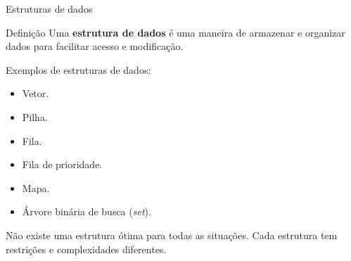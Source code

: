\begin{frame}{Estruturas de dados}

    \begin{block}{Definição}
        Uma {\bf estrutura de dados} é uma maneira de armazenar e organizar dados para facilitar acesso e modificação.
    \end{block}

    Exemplos de estruturas de dados:

    \begin{itemize}
        \item Vetor.
        \item Pilha.
        \item Fila.
        \item Fila de prioridade.
        \item Mapa.
        \item Árvore binária de busca (\textit{set}).
    \end{itemize}

    Não existe uma estrutura ótima para todas as situações. Cada estrutura tem restrições e complexidades diferentes.

\end{frame}

